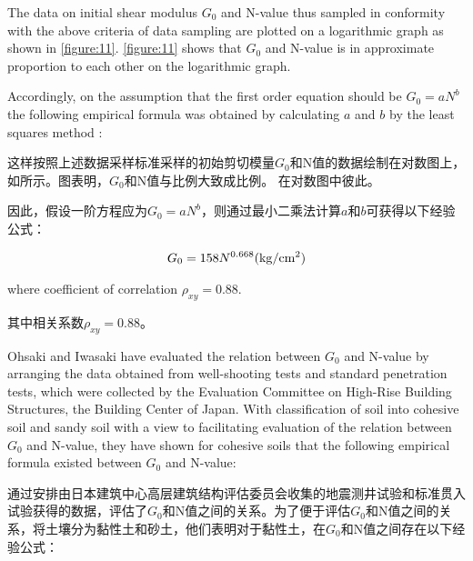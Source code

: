 \begin{paracol}{2}
    
    The data on initial shear modulus $G_0$ and N-value thus sampled in conformity with the above criteria of data sampling are plotted on a logarithmic graph as shown in \autoref{figure:11}. \autoref{figure:11} shows that $G_0$ and N-value is in approximate proportion to each other on the logarithmic graph.

    Accordingly, on the assumption that the first order equation should be $G_0=aN^b$ the following empirical formula was obtained by calculating $a$ and $b$ by the least squares method :

    \switchcolumn

    这样按照上述数据采样标准采样的初始剪切模量$G_0$和N值的数据绘制在对数图上，如所示。图表明，$G_0$和N值与比例大致成比例。 在对数图中彼此。
       
    因此，假设一阶方程应为$G_0=aN^b$，则通过最小二乘法计算$a$和$b$可获得以下经验公式： 

\end{paracol}

\begin{align}
    G_0=158N^{0.668}(\rm{kg/cm^2})
    \label{equation:9}
\end{align}

\begin{paracol}{2}
    
    \noindent{}where coefficient of correlation $\rho_{xy}=0.88$. 

    \switchcolumn

    \noindent{}其中相关系数$\rho_{xy}=0.88$。

\end{paracol}


\begin{paracol}{2}
    
    Ohsaki and Iwasaki have evaluated the relation between $G_0$ and N-value by arranging the data obtained from well-shooting tests and standard penetration tests, which were collected by the Evaluation Committee on High-Rise Building Structures, the Building Center of Japan. With classification of soil into cohesive soil and sandy soil with a view to facilitating evaluation of the relation between $G_0$ and N-value, they have shown for cohesive soils that the following empirical formula existed between $G_0$ and N-value:

    \switchcolumn

    \citet{Ohsaki197361}通过安排由日本建筑中心高层建筑结构评估委员会收集的地震测井试验和标准贯入试验获得的数据，评估了$G_0$和N值之间的关系。为了便于评估$G_0$和N值之间的关系，将土壤分为黏性土和砂土，他们表明对于黏性土，在$G_0$和N值之间存在以下经验公式：

\end{paracol}

